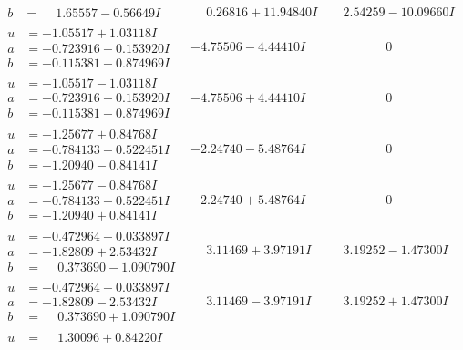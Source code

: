 \documentclass[1p]{elsarticle_modified}
\theoremstyle{definition}
\begin{document}
$$\begin{array}{c|c|c}
\begin{aligned}
b &= \phantom{-}1.65557 - 0.56649 I\end{aligned}
 & \phantom{-}0.26816 + 11.94840 I & \phantom{-}2.54259 - 10.09660 I \\ \hline\begin{aligned}
u &= -1.05517 + 1.03118 I \\
a &= -0.723916 - 0.153920 I \\
b &= -0.115381 - 0.874969 I\end{aligned}
 & -4.75506 - 4.44410 I & \phantom{-0.000000 } 0 \\ \hline\begin{aligned}
u &= -1.05517 - 1.03118 I \\
a &= -0.723916 + 0.153920 I \\
b &= -0.115381 + 0.874969 I\end{aligned}
 & -4.75506 + 4.44410 I & \phantom{-0.000000 } 0 \\ \hline\begin{aligned}
u &= -1.25677 + 0.84768 I \\
a &= -0.784133 + 0.522451 I \\
b &= -1.20940 - 0.84141 I\end{aligned}
 & -2.24740 - 5.48764 I & \phantom{-0.000000 } 0 \\ \hline\begin{aligned}
u &= -1.25677 - 0.84768 I \\
a &= -0.784133 - 0.522451 I \\
b &= -1.20940 + 0.84141 I\end{aligned}
 & -2.24740 + 5.48764 I & \phantom{-0.000000 } 0 \\ \hline\begin{aligned}
u &= -0.472964 + 0.033897 I \\
a &= -1.82809 + 2.53432 I \\
b &= \phantom{-}0.373690 - 1.090790 I\end{aligned}
 & \phantom{-}3.11469 + 3.97191 I & \phantom{-}3.19252 - 1.47300 I \\ \hline\begin{aligned}
u &= -0.472964 - 0.033897 I \\
a &= -1.82809 - 2.53432 I \\
b &= \phantom{-}0.373690 + 1.090790 I\end{aligned}
 & \phantom{-}3.11469 - 3.97191 I & \phantom{-}3.19252 + 1.47300 I \\ \hline\begin{aligned}
u &= \phantom{-}1.30096 + 0.84220 I \\

\end{aligned}
\end{array}$$
\end{document}
